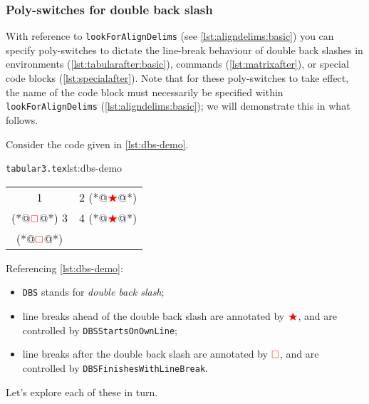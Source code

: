 \subsubsection{Poly-switches for double back slash}\label{subsec:dbs}
 With reference to \texttt{lookForAlignDelims} (see \vref{lst:aligndelims:basic})
  you can specify poly-switches to
 dictate the line-break behaviour of double back slashes in environments
 (\vref{lst:tabularafter:basic}), commands (\vref{lst:matrixafter}), or special code
 blocks (\vref{lst:specialafter}). Note that for these poly-switches to take effect, the
 name of the code block must necessarily be specified within \texttt{lookForAlignDelims}
 (\vref{lst:aligndelims:basic}); we will demonstrate this in what follows.

 Consider the code given in \cref{lst:dbs-demo}.
 \begin{cmhlistings}[style=tcblatex,escapeinside={(*@}{@*)}]{\texttt{tabular3.tex}}{lst:dbs-demo}
\begin{tabular}{cc}
 1 & 2 (*@$\color{red}\bigstar$@*)\\(*@$\color{red}\square$@*) 3 & 4 (*@$\color{red}\bigstar$@*)\\(*@$\color{red}\square$@*)
\end{tabular}
\end{cmhlistings}
 Referencing \cref{lst:dbs-demo}:
 \begin{itemize}
  \item \texttt{DBS} stands for \emph{double back slash};
  \item line breaks ahead of the double back slash are annotated by $\color{red}\bigstar$, and
        are controlled by \texttt{DBSStartsOnOwnLine};
  \item line breaks after the double back slash are annotated by $\color{red}\square$,
        and are controlled by \texttt{DBSFinishesWithLineBreak}.
 \end{itemize}

 Let's explore each of these in turn.

